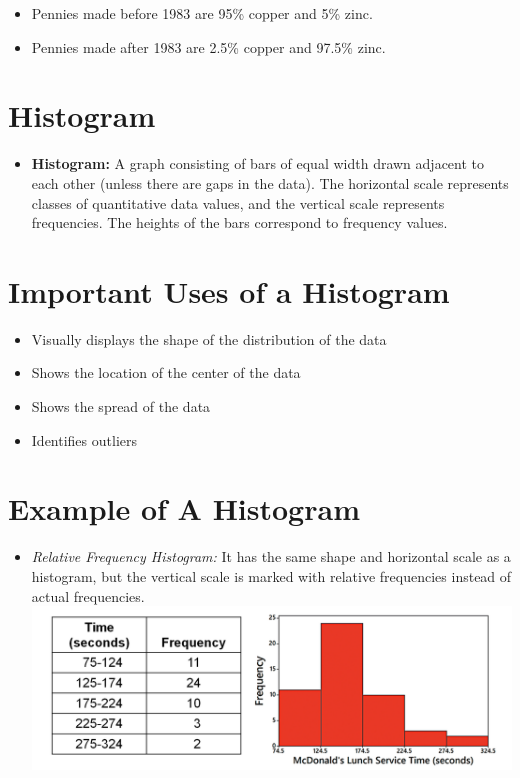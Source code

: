 \documentclass[]{book}
\providecommand{\tightlist}{%
  \setlength{\itemsep}{0pt}\setlength{\parskip}{0pt}}
\begin{document}
\begin{itemize}
\tightlist
\item
  Pennies made before 1983 are 95\% copper and 5\% zinc.
\item
  Pennies made after 1983 are 2.5\% copper and 97.5\% zinc.
\end{itemize}

\hypertarget{histogram}{%
\section{Histogram}\label{histogram}}

\begin{itemize}
\tightlist
\item
  \textbf{Histogram:} A graph consisting of bars of equal width drawn adjacent to each other (unless there are gaps in the data). The horizontal scale represents classes of quantitative data values, and the vertical scale represents frequencies. The heights of the bars correspond to frequency values.
\end{itemize}

\hypertarget{important-uses-of-a-histogram}{%
\section{Important Uses of a Histogram}\label{important-uses-of-a-histogram}}

\begin{itemize}
\tightlist
\item
  Visually displays the shape of the distribution of the data
\item
  Shows the location of the center of the data
\item
  Shows the spread of the data
\item
  Identifies outliers
\end{itemize}

\hypertarget{example-of-a-histogram}{%
\section{Example of A Histogram}\label{example-of-a-histogram}}

\begin{itemize}
\tightlist
\item
  \emph{Relative Frequency Histogram:} It has the same shape and horizontal scale as a histogram, but the vertical scale is marked with relative frequencies instead of actual frequencies.
  \includegraphics{histogram.png}
\end{itemize}
\end{document}
